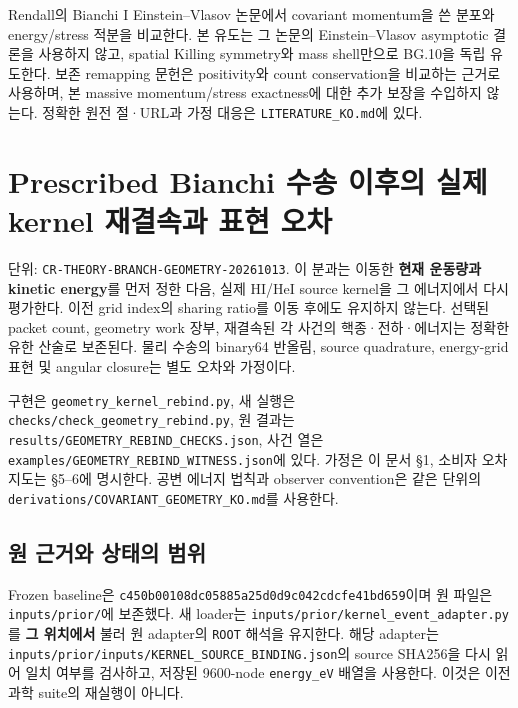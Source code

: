 Rendall의 Bianchi I Einstein--Vlasov 논문에서 covariant momentum을 쓴 분포와 energy/stress 적분을 비교한다. 본 유도는 그 논문의 Einstein--Vlasov asymptotic 결론을 사용하지 않고, spatial Killing symmetry와 mass shell만으로 BG.10을 독립 유도한다. 보존 remapping 문헌은 positivity와 count conservation을 비교하는 근거로 사용하며, 본 massive momentum/stress exactness에 대한 추가 보장을 수입하지 않는다. 정확한 원전 절·URL과 가정 대응은 \texttt{LITERATURE\_KO.md}에 있다.

\clearpage

\hypertarget{prescribed-bianchi-uxc218uxc1a1-uxc774uxd6c4uxc758-uxc2e4uxc81c-kernel-uxc7acuxacb0uxc18duxacfc-uxd45cuxd604-uxc624uxcc28}{%
\section{Prescribed Bianchi 수송 이후의 실제 kernel 재결속과 표현 오차}\label{prescribed-bianchi-uxc218uxc1a1-uxc774uxd6c4uxc758-uxc2e4uxc81c-kernel-uxc7acuxacb0uxc18duxacfc-uxd45cuxd604-uxc624uxcc28}}

단위: \nolinkurl{CR-THEORY-BRANCH-GEOMETRY-20261013}. 이 분과는 이동한 \textbf{현재 운동량과 kinetic energy}를 먼저 정한 다음, 실제 HI/HeI source kernel을 그 에너지에서 다시 평가한다. 이전 grid index의 sharing ratio를 이동 후에도 유지하지 않는다. 선택된 packet count, geometry work 장부, 재결속된 각 사건의 핵종·전하·에너지는 정확한 유한 산술로 보존된다. 물리 수송의 binary64 반올림, source quadrature, energy-grid 표현 및 angular closure는 별도 오차와 가정이다.

구현은 \texttt{geometry\_kernel\_rebind.py}, 새 실행은 \nolinkurl{checks/check_geometry_rebind.py}, 원 결과는 \nolinkurl{results/GEOMETRY_REBIND_CHECKS.json}, 사건 열은 \nolinkurl{examples/GEOMETRY_REBIND_WITNESS.json}에 있다. 가정은 이 문서 §1, 소비자 오차 지도는 §5--6에 명시한다. 공변 에너지 법칙과 observer convention은 같은 단위의 \nolinkurl{derivations/COVARIANT_GEOMETRY_KO.md}를 사용한다.

\hypertarget{uxc6d0-uxadfcuxac70uxc640-uxc0c1uxd0dcuxc758-uxbc94uxc704}{%
\subsection{원 근거와 상태의 범위}\label{uxc6d0-uxadfcuxac70uxc640-uxc0c1uxd0dcuxc758-uxbc94uxc704}}

Frozen baseline은 \nolinkurl{c450b00108dc05885a25d0d9c042cdcfe41bd659}이며 원 파일은 \texttt{inputs/prior/}에 보존했다. 새 loader는 \nolinkurl{inputs/prior/kernel_event_adapter.py}를 \textbf{그 위치에서} 불러 원 adapter의 \texttt{ROOT} 해석을 유지한다. 해당 adapter는 \nolinkurl{inputs/prior/inputs/KERNEL_SOURCE_BINDING.json}의 source SHA256을 다시 읽어 일치 여부를 검사하고, 저장된 9600-node \texttt{energy\_eV} 배열을 사용한다. 이것은 이전 과학 suite의 재실행이 아니다.

